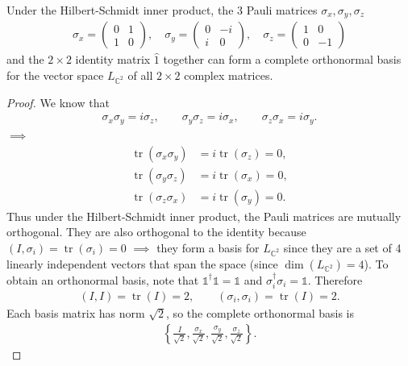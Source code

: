 \documentclass[11pt, answers]{exam}
\theoremstyle{definition}
\theoremstyle{bulleted}
\begin{document}
	\noindent Under the Hilbert-Schmidt inner product, the 3 Pauli matrices $\sigma_x,\sigma_y,\sigma_z$
	\begin{align*}
		\sigma_x=\begin{pmatrix}0&1\\1&0\end{pmatrix},\quad
		\sigma_y=\begin{pmatrix}0&-i\\i&0\end{pmatrix},\quad
		\sigma_z=\begin{pmatrix}1&0\\0&-1\end{pmatrix}
	\end{align*}
	and the $2\times2$ identity matrix $\hat1$ together can form a complete orthonormal basis for the vector space $L_{\mathbb C^2}$ of all $2\times2$ complex matrices.
		\begin{proof}
			We know that
			\begin{align*}
				\sigma_x\sigma_y=i\sigma_z,\qquad
				\sigma_y\sigma_z=i\sigma_x,\qquad
				\sigma_z\sigma_x=i\sigma_y.
			\end{align*}
			$\implies$
			\begin{align*}
				\operatorname{tr}(\sigma_x\sigma_y)&=i\operatorname{tr}(\sigma_z)=0,\\
				\operatorname{tr}(\sigma_y\sigma_z)&=i\operatorname{tr}(\sigma_x)=0,\\
				\operatorname{tr}(\sigma_z\sigma_x)&=i\operatorname{tr}(\sigma_y)=0.
			\end{align*}
			Thus under the Hilbert-Schmidt inner product, the Pauli matrices are mutually orthogonal. They are also orthogonal to the identity because $(I,\sigma_i)=\operatorname{tr}(\sigma_i)=0$ $\implies$ they form a basis for $L_{\mathbb C^2}$ since they are a set of 4 linearly independent vectors that span the space (since $\dim(L_{\mathbb C^2})=4$). To obtain an orthonormal basis, note that $\mathds{1}^\dagger \mathds{1}=\mathds{1}$ and $\sigma_i^\dagger\sigma_i=\mathds{1}$. Therefore
			\begin{align*}
				(I,I)=\operatorname{tr}(I)=2,\qquad
				(\sigma_i,\sigma_i)=\operatorname{tr}(I)=2.
			\end{align*}
			Each basis matrix has norm $\sqrt2$, so the complete orthonormal basis is
			\begin{align*}
				\left\{\frac{I}{\sqrt2},\frac{\sigma_x}{\sqrt2},
				\frac{\sigma_y}{\sqrt2},\frac{\sigma_z}{\sqrt2}\right\}.
			\end{align*}
		\end{proof}
\end{document}
